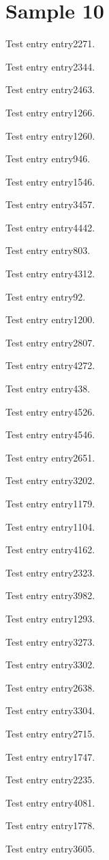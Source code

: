 \chapter{Sample 10}
Test entry \gls{entry2271}.

Test entry \gls{entry2344}.

Test entry \gls{entry2463}.

Test entry \gls{entry1266}.

Test entry \gls{entry1260}.

Test entry \gls{entry946}.

Test entry \gls{entry1546}.

Test entry \gls{entry3457}.

Test entry \gls{entry4442}.

Test entry \gls{entry803}.

Test entry \gls{entry4312}.

Test entry \gls{entry92}.

Test entry \gls{entry1200}.

Test entry \gls{entry2807}.

Test entry \gls{entry4272}.

Test entry \gls{entry438}.

Test entry \gls{entry4526}.

Test entry \gls{entry4546}.

Test entry \gls{entry2651}.

Test entry \gls{entry3202}.

Test entry \gls{entry1179}.

Test entry \gls{entry1104}.

Test entry \gls{entry4162}.

Test entry \gls{entry2323}.

Test entry \gls{entry3982}.

Test entry \gls{entry1293}.

Test entry \gls{entry3273}.

Test entry \gls{entry3302}.

Test entry \gls{entry2638}.

Test entry \gls{entry3304}.

Test entry \gls{entry2715}.

Test entry \gls{entry1747}.

Test entry \gls{entry2235}.

Test entry \gls{entry4081}.

Test entry \gls{entry1778}.

Test entry \gls{entry3605}.

